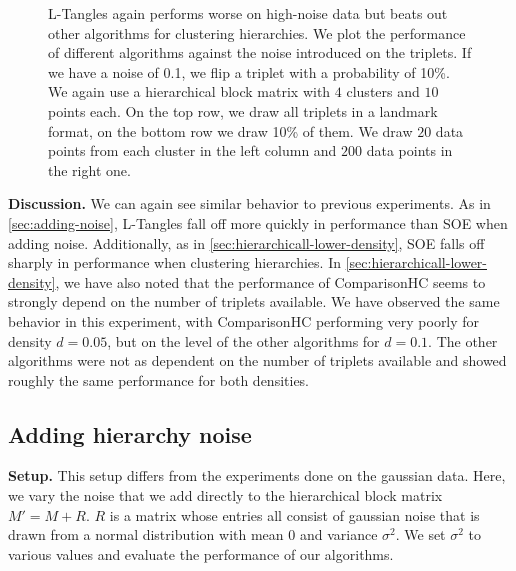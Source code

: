 \begin{figure}[ht]
    \centering
    \hfill
    \caption{
        L-Tangles again performs worse on high-noise data but beats out other algorithms for clustering hierarchies.
        We plot the performance of different algorithms against the noise introduced on the triplets. 
        If we have a noise of 0.1, we flip a triplet with a probability of 10\%.  
        We again use a hierarchical block matrix with $4$ clusters and $10$ points each. 
        On the top row, we draw all triplets in a landmark format, on the bottom row we draw 10\% of them.    
        We draw $20$ data points from each cluster in the left column and $200$ data points in the right one.
    }
    \label{fig:hierarchy-add-triplet-noise}
\end{figure}

\noindent
\textbf{Discussion.}
We can again see similar behavior to previous experiments. As in \autoref{sec:adding-noise}, L-Tangles fall off more quickly in performance than SOE when adding noise. 
Additionally, as in \autoref{sec:hierarchicall-lower-density}, SOE falls off sharply in performance when clustering hierarchies. In \autoref{sec:hierarchicall-lower-density}, 
we have also noted that the performance of ComparisonHC seems to strongly depend on the number of triplets available. We have observed the same behavior in this experiment,
with ComparisonHC performing very poorly for density $d=0.05$, but on the level of the other algorithms for $d=0.1$. The other algorithms were not as dependent on the number of 
triplets available and showed roughly the same performance for both densities.

\FloatBarrier
\subsection{Adding hierarchy noise}\label{sec:adding-hierarchy-noise}
\textbf{Setup.}
This setup differs from the experiments done on the gaussian data. Here, we vary the noise that we add directly to the hierarchical block matrix $M' = M + R$. 
$R$ is a matrix whose entries all consist of gaussian noise that is drawn from a normal distribution with mean $0$ and variance $\sigma^2$. We set $\sigma^2$ to various 
values and evaluate the performance of our algorithms. 

